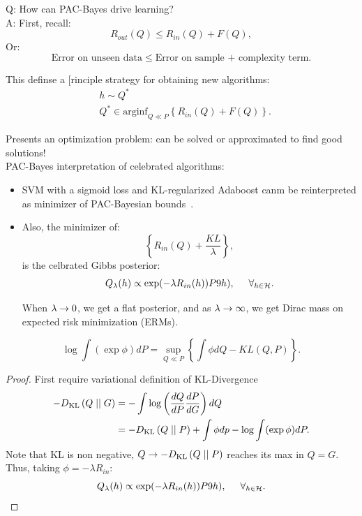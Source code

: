 Q: How can PAC-Bayes drive learning? \\

A: First, recall:
\begin{equation}
    R_{out}(Q) \leq R_{in}(Q) + F(Q),
\end{equation}
Or:
\begin{equation}
    \text{Error on unseen data} \leq \text{Error on sample + complexity term}.
\end{equation}

This definse a [rinciple strategy for obtaining new algorithms:
\begin{align}
    &h \sim Q^* \\
    &Q^* \in \text{arginf}_{Q \ll P} \left\{R_{in}(Q) + F(Q)\right\}.
\end{align}

Presents an optimization problem: can be solved or approximated to find good solutions! \\

PAC-Bayes interpretation of celebrated algorithms: 
\begin{itemize}
    \item SVM with a sigmoid loss and KL-regularized Adaboost canm be reinterpreted as minimizer of PAC-Bayesian bounds~\cite{ambroladze2007tighter}.
    \item Also, the minimizer of:
    \[
    \left\{R_{in}(Q) + \frac{KL}{\lambda}\right\},
    \]
    is the celbrated Gibbs posterior:
    \[
    Q_\lambda(h) \propto \exp(-\lambda R_{in}(h)) P9h), \hspace{5mm} \forall_{h \in \mathcal{H}}.
    \]
    
    When $\lambda \rightarrow 0$, we get a flat posterior, and as $\lambda \rightarrow \infty$, we get Dirac mass on expected risk minimization (ERMs).
\end{itemize}



\begin{theorem}
\[
\log \int (\exp \phi) dP = \sup_{Q \ll P} \left\{ \int \phi dQ - KL(Q,P)\right\}.
\]
\end{theorem}
\begin{proof}
First require variational definition of KL-Divergence~\cite{csiszar1975divergence}
\begin{align}
    -D_{\text{KL}}\left(Q \mid \mid G\right) &= - \int \log\left(\frac{dQ}{dP} \frac{dP}{dG}\right) dQ \\
    &= -D_{\text{KL}}\left(Q \mid \mid P\right) + \int \phi dp - \log \int(\exp \phi) dP.
\end{align}
Note that KL is non negative, $Q \rightarrow -D_{\text{KL}}\left(Q \mid \mid P\right)$ reaches its max in $Q=G$. Thus, taking $\phi = -\lambda R_{in}$:
\[
Q_\lambda(h) \propto \exp(-\lambda R_{in}(h)) P9h), \hspace{5mm} \forall_{h \in \mathcal{H}}. \qedhere
\]
\end{proof}


